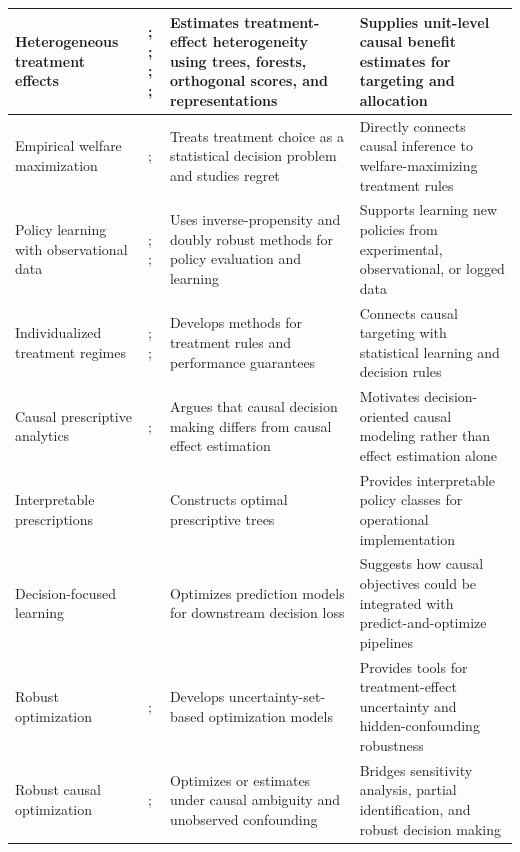 \documentclass[11pt]{article}
\begin{document}
\begin{longtable}{p{} p{} p{} p{}}
\midrule
Heterogeneous treatment effects & \citet{athey2016recursive}; \citet{wager2018causalforest}; \citet{athey2019grf}; \citet{chernozhukov2018dml}; \citet{shalit2017estimating} & Estimates treatment-effect heterogeneity using trees, forests, orthogonal scores, and representations & Supplies unit-level causal benefit estimates for targeting and allocation \\
\midrule
Empirical welfare maximization & \citet{manski2004statistical}; \citet{kitagawa2018treated} & Treats treatment choice as a statistical decision problem and studies regret & Directly connects causal inference to welfare-maximizing treatment rules \\
\midrule
Policy learning with observational data & \citet{dudik2011doubly}; \citet{swaminathan2015counterfactual}; \citet{athey2021policy} & Uses inverse-propensity and doubly robust methods for policy evaluation and learning & Supports learning new policies from experimental, observational, or logged data \\
\midrule
Individualized treatment regimes & \citet{zhao2012owl}; \citet{qian2011performance}; \citet{zhang2012robust} & Develops methods for treatment rules and performance guarantees & Connects causal targeting with statistical learning and decision rules \\
\midrule
Causal prescriptive analytics & \citet{fernandez2022causal}; \citet{leporeni2023causally} & Argues that causal decision making differs from causal effect estimation & Motivates decision-oriented causal modeling rather than effect estimation alone \\
\midrule
Interpretable prescriptions & \citet{bertsimas2019optimal} & Constructs optimal prescriptive trees & Provides interpretable policy classes for operational implementation \\
\midrule
Decision-focused learning & \citet{elmachtoub2022smart} & Optimizes prediction models for downstream decision loss & Suggests how causal objectives could be integrated with predict-and-optimize pipelines \\
\midrule
Robust optimization & \citet{ben2009robust}; \citet{bertsimas2011theory} & Develops uncertainty-set-based optimization models & Provides tools for treatment-effect uncertainty and hidden-confounding robustness \\
\midrule
Robust causal optimization & \citet{kallus2018confounding}; \citet{duchi2023drocausal} & Optimizes or estimates under causal ambiguity and unobserved confounding & Bridges sensitivity analysis, partial identification, and robust decision making \\

\end{longtable}
\end{document}
